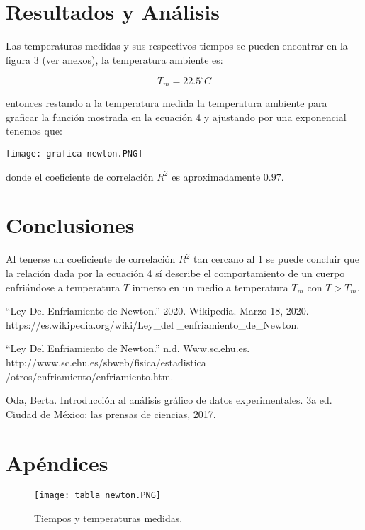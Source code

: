 \documentclass[DIV=calc, paper=a4, fontsize=11pt]{scrartcl}
\newenvironment{Figura}
  {\par\medskip\noindent\minipage{\linewidth}}
  {\endminipage\par\medskip}
\begin{document}
\begin{multicols}{2}
\section*{Resultados y Análisis}

Las temperaturas medidas y sus respectivos tiempos se pueden encontrar en la figura 3 (ver anexos), la temperatura ambiente es:

\begin{equation*}
    T_m = 22.5 ^\circ C
\end{equation*}



\noindent entonces restando a la temperatura medida la temperatura ambiente para graficar la función mostrada en la ecuación 4 y ajustando por una exponencial tenemos que:



\begin{Figura}
    \centering
    \texttt{[image: grafica newton.PNG]}
    \label{fig}
\end{Figura}

\noindent donde el coeficiente de correlación $R^2$ es aproximadamente $0.97$.



\section*{Conclusiones}

Al tenerse un coeficiente de correlación $R^2$ tan cercano al 1 se puede concluir que la relación dada por la ecuación 4 sí describe el comportamiento de un cuerpo enfriándose a temperatura $T$ inmerso en un medio a temperatura $T_m$ con $T> T_m$.


  
\begin{thebibliography}{99}

 “Ley Del Enfriamiento de Newton.” 2020. Wikipedia. Marzo 18, 2020. https://es.wikipedia.org/wiki/Ley\_del
\_enfriamiento\_de\_Newton.

 “Ley Del Enfriamiento de Newton.” n.d. Www.sc.ehu.es. http://www.sc.ehu.es/sbweb/fisica/estadistica
/otros/enfriamiento/enfriamiento.htm.

 Oda, Berta. Introducción al análisis gráfico de datos experimentales. 3a ed. Ciudad de México: las prensas de ciencias, 2017.

\end{thebibliography}








\end{multicols}

\newpage

\section*{Apéndices}

\begin{figure}[h!]
    \centering
    \texttt{[image: tabla newton.PNG]}
    \caption{Tiempos y temperaturas medidas.}
    \label{fig:my_label}
\end{figure}
\end{document}
